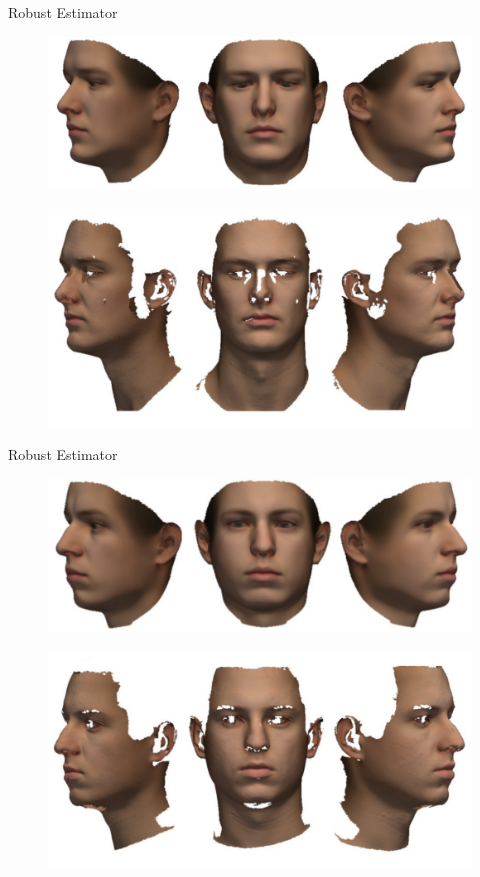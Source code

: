 \documentclass[xcolor=x11names,compress]{beamer}
\begin{document}
\begin{frame}{Robust Estimator}
    \begin{figure}
        \centering
        \includegraphics[width=.8\textwidth]{../resources/img/00029_fit.pdf}
    \end{figure}
    \begin{figure}
        \centering
        \includegraphics[width=.8\textwidth]{../resources/img/00029_textured_target.pdf}
    \end{figure}
\end{frame}

\begin{frame}{Robust Estimator}
    \begin{figure}
        \centering
        \includegraphics[width=.8\textwidth]{../resources/img/00303_fit.pdf}
    \end{figure}
    \begin{figure}
        \centering
        \includegraphics[width=.8\textwidth]{../resources/img/00303_textured_target.pdf}
    \end{figure}
\end{frame}
\end{document}
